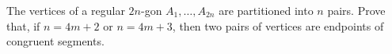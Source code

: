 The vertices of a regular $2n$-gon $A_1, \ldots, A_{2n}$ are partitioned into $n$ pairs. Prove that, if $n = 4m + 2$ or $n = 4m + 3$, then two pairs of vertices are endpoints of congruent segments.
